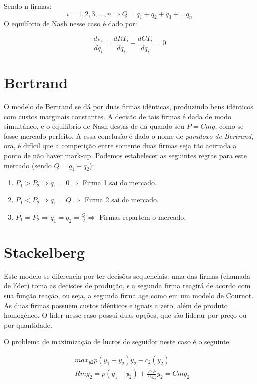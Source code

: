 \documentclass[12pt,a4paper,oneside,brazil]{abntex2}
\begin{document}
Sendo n firmas:
\[ i = 1, 2 , 3, ..., n \Rightarrow Q = q_1 + q_2 + q_3 + ... q_n\]
O equilíbrio de Nash nesse caso é dado por:

\begin{equation}
	\frac{d \pi_i}{d q_i} = \frac{d RT_i}{d q_i} - \frac{d CT_i}{d q_i} = 0
\end{equation} 
	

\section{Bertrand}
O modelo de Bertrand se dá por duas firmas idênticas, produzindo bens idênticos com custos marginais constantes. A decisão de tais firmas é dada de modo simultâneo,  e o equilíbrio de Nash destas de dá quando seu $P = Cmg$, como se fosse mercado perfeito. A essa conclusão é dado o nome de \emph{paradoxo de Bertrand}, ora, é difícil que a competição entre somente duas firmas seja tão acirrada a ponto de não haver mark-up. Podemos estabelecer as seguintes regras para este mercado (sendo $Q = q_1 + q_2$):
\begin{enumerate}
\item $P_1 > P_2  \Rightarrow q_1 = 0 \Rightarrow$ Firma 1 sai do mercado.
\item $P_1 <  P_2  \Rightarrow  q_1 = Q \Rightarrow$ Firma 2 sai do mercado.
\item $ P_1 = P_2 \Rightarrow q_1 = q_2 = \frac{Q}{2} \Rightarrow$ Firmas repartem o mercado.
\end{enumerate}

\section{Stackelberg}
Este modelo se diferencia por ter decisões sequenciais: uma das firmas (chamada de líder) toma as decisões de produção, e a segunda firma reagirá de acordo com sua função reação, ou seja, a segunda firma age como em um modelo de Cournot. As duas firmas possuem custos idênticos e iguais a zero, além de produto homogêneo. O líder nesse caso possui duas opções, que são liderar por preço ou por quantidade.

O problema de maximização de lucros do seguidor neste caso é o seguinte:

\begin{align}
& max_{y2} p(y_1 + y_2) y_2 -c_2 (y_2) \\
& Rmg_2 = p (y_1 + y_2) + \frac{\triangle P}{\triangle y_2} y_2 = Cmg_2
\end{align}
\end{document}
